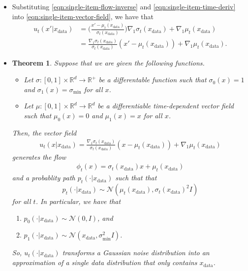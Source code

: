 \documentclass[10pt]{article}
\newtheorem{theorem}[lemma]{Theorem}
\newcommand{\ra}{\rightarrow}
\newcommand{\mcal}[1]{\mathcal{#1}}
\newcommand{\Real}{\mathbb{R}}
\newcommand{\data}{\mathrm{data}}
\begin{document}
\begin{itemize}
  \item Substituting \eqref{eqn:single-item-flow-inverse} and \eqref{eqn:single-item-time-deriv} into \eqref{eqn:single-item-vector-field}, we have that
  \begin{align*}
    u_t(x'|x_{\data}) 
    &= \bigg( \frac{x' - \mu_t(x_{\data})}{\sigma_t(x_{\data})} \bigg) \nabla_1 \sigma_t(x_{\data}) + \nabla_1 \mu_t(x_{\data}) \\
    &= \frac{\nabla_1 \sigma_t(x_{\data})}{\sigma_t(x_{\data})}(x' - \mu_t(x_{\data})) + \nabla_1 \mu_t(x_{\data}).
  \end{align*}

  \item \begin{theorem}
    Suppose that we are given the following functions.
    \begin{itemize}
      \item Let $\sigma: [0,1] \times \Real^d \ra \Real^+$ be a differentable function such that $\sigma_0(x) = 1$ and $\sigma_1(x) = \sigma_{\min}$ for all $x$.
      \item Let $\mu: [0,1] \times \Real^d \ra \Real^d$ be a differentiable time-dependent vector field such that $\mu_0(x) = 0$ and $\mu_1(x) = x$ for all $x$.
    \end{itemize}
    Then, the vector field
    \begin{align*}
      u_t(x|x_{\data}) = \frac{\nabla_1 \sigma_t(x_{\data})}{\sigma_t(x_{\data})}(x - \mu_t(x_{\data})) + \nabla_1 \mu_t(x_{\data})
    \end{align*}
    generates the flow
    \begin{align*}
      \phi_t(x) = \sigma_t(x_{\data}) x + \mu_t(x_{\data})
    \end{align*}
    and a probablity path $p_t(\cdot|x_{\data})$ such that that $$p_t(\cdot|x_{\data}) \sim \mcal{N}(\mu_t(x_{\data}), \sigma_t(x_{\data})^2 I)$$ for all $t$. In particular, we have that
    \begin{enumerate}
      \item $p_0(\cdot|x_{\data}) \sim \mcal{N}(0,I)$, and 
      \item $p_1(\cdot|x_{\data}) \sim \mcal{N}(x_{\data}, \sigma_{\min}^2 I)$.      
    \end{enumerate}
    So, $u_t(\cdot|x_{\data})$ transforms a Gaussian noise distribution into an approximation of a single data distribution that only contains $x_{\data}$.
  \end{theorem}
\end{itemize}
\end{document}

